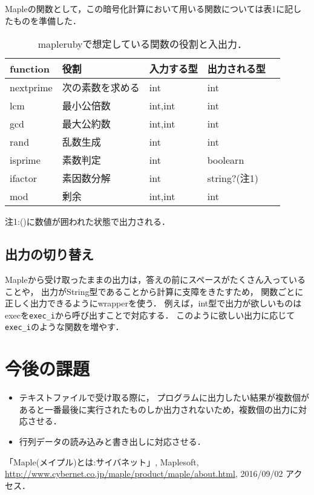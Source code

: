 \documentclass[10pt,a4j,twocolumn]{jsarticle}
\begin{document}
Mapleの関数として，この暗号化計算において用いる関数については表1に記したものを準備した．
\begin{table}[htbp]\begin{center}
\caption{maplerubyで想定している関数の役割と入出力．}
\begin{tabular}{lllll}
\hline
function  &役割  &入力する型  &出力される型  \\ \hline
nextprime  &次の素数を求める  &int  &int  \\
lcm  &最小公倍数  &int,int  &int  \\
gcd  &最大公約数  &int,int  &int  \\
rand  &乱数生成  &int  &int  \\
isprime  &素数判定  &int  &boolearn  \\
ifactor  &素因数分解  &int  &string?(注1)  \\
mod  &剰余  &int,int  &int  \\
\hline
\end{tabular}
注1:()に数値が囲われた状態で出力される．
\label{default}
\end{center}
\end{table}

\subsection{出力の切り替え}
Mapleから受け取ったままの出力は，答えの前にスペースがたくさん入っていることや，
出力がString型であることから計算に支障をきたすため，
関数ごとに正しく出力できるようにwrapperを使う．
例えば，int型で出力が欲しいものはexecを\verb|exec_i|から呼び出すことで対応する．
このように欲しい出力に応じて\verb|exec_i|のような関数を増やす．

\section{今後の課題}
\begin{itemize}
\item テキストファイルで受け取る際に，
プログラムに出力したい結果が複数個があると一番最後に実行されたものしか出力されないため，複数個の出力に対応させる．
\item 行列データの読み込みと書き出しに対応させる．
\end{itemize}
\begin{flushleft}
\begin{thebibliography}{9}
「Maple(メイプル)とは:サイバネット」, Maplesoft, \url{http://www.cybernet.co.jp/maple/product/maple/about.html}, 2016/09/02 アクセス．
\end{thebibliography}
\end{flushleft}
\end{document}
